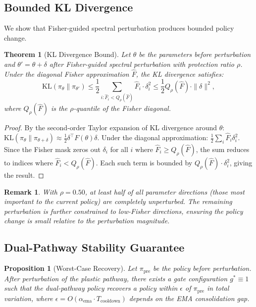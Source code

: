 \documentclass{article}
\newtheorem{theorem}{Theorem}
\newtheorem{proposition}{Proposition}
\newtheorem{remark}{Remark}
\newcommand{\KL}{\mathrm{KL}}
\begin{document}
\subsection{Bounded KL Divergence}

We show that Fisher-guided spectral perturbation produces bounded policy change.

\begin{theorem}[KL Divergence Bound]
\label{thm:kl_bound}
Let $\theta$ be the parameters before perturbation and $\theta' = \theta + \delta$ after Fisher-guided spectral perturbation with protection ratio $\rho$. Under the diagonal Fisher approximation $\hat{F}$, the KL divergence satisfies:
\begin{equation}
    \KL(\pi_\theta \| \pi_{\theta'}) \leq \frac{1}{2} \sum_{i: \hat{F}_i < Q_\rho(\hat{F})} \hat{F}_i \cdot \delta_i^2 \leq \frac{1}{2} Q_\rho(\hat{F}) \cdot \|\delta\|^2,
\end{equation}
where $Q_\rho(\hat{F})$ is the $\rho$-quantile of the Fisher diagonal.
\end{theorem}

\begin{proof}
By the second-order Taylor expansion of KL divergence around $\theta$:
$\KL(\pi_\theta \| \pi_{\theta+\delta}) \approx \frac{1}{2} \delta^\top F(\theta) \delta$.
Under the diagonal approximation: $\frac{1}{2} \sum_i \hat{F}_i \delta_i^2$.
Since the Fisher mask zeros out $\delta_i$ for all $i$ where $\hat{F}_i \geq Q_\rho(\hat{F})$, the sum reduces to indices where $\hat{F}_i < Q_\rho(\hat{F})$. Each such term is bounded by $Q_\rho(\hat{F}) \cdot \delta_i^2$, giving the result.
\end{proof}

\begin{remark}
With $\rho = 0.50$, at least half of all parameter directions (those most important to the current policy) are completely unperturbed. The remaining perturbation is further constrained to low-Fisher directions, ensuring the policy change is small relative to the perturbation magnitude.
\end{remark}


\subsection{Dual-Pathway Stability Guarantee}

\begin{proposition}[Worst-Case Recovery]
\label{prop:stability}
Let $\pi_{\text{pre}}$ be the policy before perturbation. After perturbation of the plastic pathway, there exists a gate configuration $g^* \equiv 1$ such that the dual-pathway policy recovers a policy within $\epsilon$ of $\pi_{\text{pre}}$ in total variation, where $\epsilon = O(\alpha_{\text{ema}} \cdot T_{\text{cooldown}})$ depends on the EMA consolidation gap.
\end{proposition}
\end{document}
